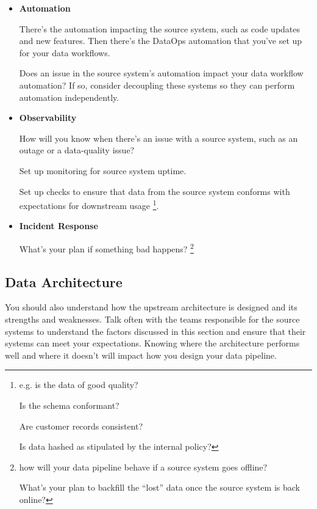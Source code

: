 \begin{itemize}
    \item \textbf{Automation}
    
    \noindent
    There's the automation impacting the source system, such as
    code updates and new features. Then there's the DataOps
    automation that you've set up for your
    data workflows.
    
    Does an issue in the source system's automation impact your
    data workflow automation? If so, consider decoupling these
    systems so they can perform automation independently.


    \item \textbf{Observability}
    
    \noindent
    How will you know when there's an issue with a source system,
    such as an outage or a data-quality issue?

    Set up monitoring for source system uptime.

    Set up checks to ensure that data from the source system
    conforms with expectations for downstream usage
    \footnote{
        e.g. is the data of good quality?

        Is the schema conformant?
        
        Are customer records consistent?
        
        Is data hashed as stipulated by the internal policy?
    }.

    \item \textbf{Incident Response}
    
    \noindent
    What's your plan if something bad happens?
    \footnote{
        how will your data pipeline behave if a source system goes
        offline?

        What's your plan to backfill the “lost” data once the
        source system is back online?
    }
\end{itemize}



\subsection*{Data Architecture}
You should also understand how the upstream architecture is
designed and its strengths and weaknesses. Talk often with the
teams responsible for the source systems to understand the factors
discussed in this section and ensure that their systems can meet
your expectations. Knowing where the architecture performs
well and where it doesn't will impact how you design your data
pipeline.

